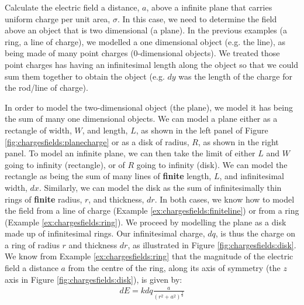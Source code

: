 \newpage
\begin{example}{\label{ex:chargesfields:squarecircle}Calculate the electric field a distance, $a$, above a infinite plane that carries uniform charge per unit area, $\sigma$.}
In this case, we need to determine the field above an object that is two dimensional (a plane). In the previous examples (a ring, a line of charge), we modelled a one dimensional object (e.g. the line), as being made of many point charges (0-dimensional objects). We treated those point charges has having an infinitesimal length along the object so that we could sum them together to obtain the object (e.g. $dy$ was the length of the charge for the rod/line of charge).
 
In order to model the two-dimensional object (the plane), we model it has being the sum of many one dimensional objects. We can model a plane either as a rectangle of width, $W$, and length, $L$, as shown in the left panel of Figure \ref{fig:chargesfields:planecharge} or as a disk of radius, $R$, as shown in the right panel. To model an infinite plane, we can then take the limit of either $L$ and $W$ going to infinity (rectangle), or of $R$ going to infinity (disk). We can model the rectangle as being the sum of many lines of \textbf{finite} length, $L$, and infinitesimal width, $dx$. Similarly, we can model the disk as the sum of infinitesimally thin rings of \textbf{finite} radius, $r$, and thickness, $dr$. In both cases, we know how to model the field from a line of charge (Example \ref{ex:chargesfields:finiteline}) or from a ring (Example \ref{ex:chargesfields:ring}). 
We proceed by modelling the plane as a disk made up of infinitesimal rings. Our infinitesimal charge, $dq$, is thus the charge on a ring of radius $r$ and thickness $dr$, as illustrated in Figure \ref{fig:chargesfields:disk}.
We know from Example \ref{ex:chargesfields:ring} that the magnitude of the electric field a distance $a$ from the centre of the ring, along its axis of symmetry (the $z$ axis in Figure \ref{fig:chargesfields:disk}), is given by:
\begin{align*}
dE = kdq\frac{a}{(r^2+a^2)^\frac{3}{2}} 
\end{align*}

\end{example}
